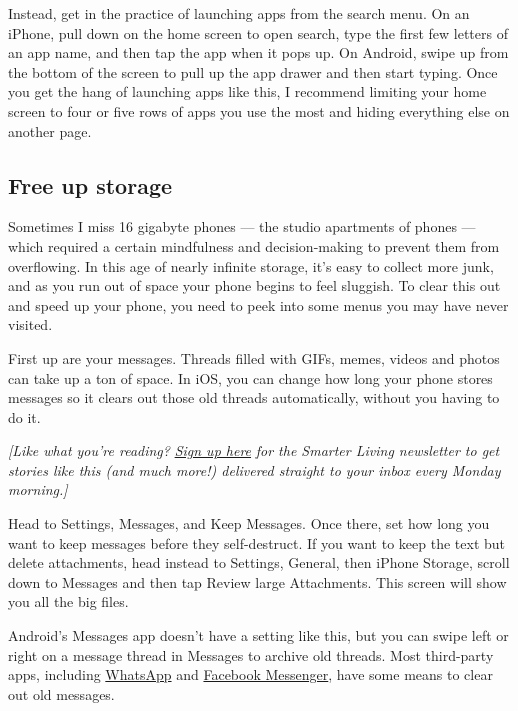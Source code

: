 Instead, get in the practice of launching apps from the search menu. On
an iPhone, pull down on the home screen to open search, type the first
few letters of an app name, and then tap the app when it pops up. On
Android, swipe up from the bottom of the screen to pull up the app
drawer and then start typing. Once you get the hang of launching apps
like this, I recommend limiting your home screen to four or five rows of
apps you use the most and hiding everything else on another page.

\hypertarget{free-up-storage}{%
\subsection{Free up storage}\label{free-up-storage}}

Sometimes I miss 16 gigabyte phones --- the studio apartments of phones
--- which required a certain mindfulness and decision-making to prevent
them from overflowing. In this age of nearly infinite storage, it's easy
to collect more junk, and as you run out of space your phone begins to
feel sluggish. To clear this out and speed up your phone, you need to
peek into some menus you may have never visited.

First up are your messages. Threads filled with GIFs, memes, videos and
photos can take up a ton of space. In iOS, you can change how long your
phone stores messages so it clears out those old threads automatically,
without you having to do it.

\emph{{[}Like what you're reading?}
\href{https://www.nytimes.com/newsletters/smarter-living?module=inline}{\emph{Sign
up here}} \emph{for the Smarter Living newsletter to get stories like
this (and much more!) delivered straight to your inbox every Monday
morning.{]}}

Head to Settings, Messages, and Keep Messages. Once there, set how long
you want to keep messages before they self-destruct. If you want to keep
the text but delete attachments, head instead to Settings, General, then
iPhone Storage, scroll down to Messages and then tap Review large
Attachments. This screen will show you all the big files.

Android's Messages app doesn't have a setting like this, but you can
swipe left or right on a message thread in Messages to archive old
threads. Most third-party apps, including
\href{https://faq.whatsapp.com/en/android/26000068/}{WhatsApp} and
\href{https://www.facebook.com/help/messenger-app/242107552657620/}{Facebook
Messenger}, have some means to clear out old messages.

